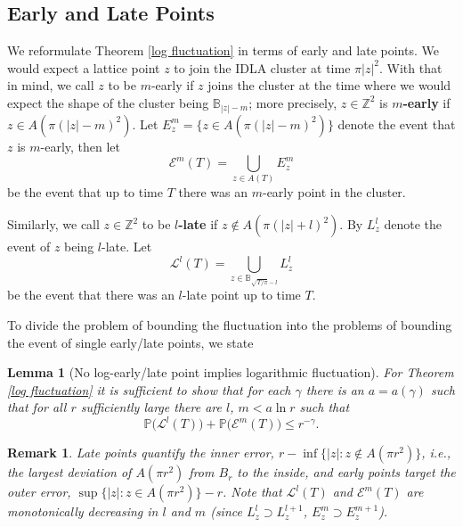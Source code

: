 \documentclass[11pt]{article}
\numberwithin{equation}{section}
\newtheorem{lemma}[theorem]{Lemma}
\newtheorem*{remark}{Remark}
\begin{document}
\subsection{Early and Late Points}

We reformulate Theorem \ref{log fluctuation} 
in terms of early and late points. 
We would expect a lattice point 
$z$ to join the IDLA cluster at time 
$\pi |z|^2$. With that in mind, we call $z$ to be
$m$-early if $z$ joins the cluster at the time 
where we would expect the shape of the cluster 
being $\mathbb{B}_{|z|-m}$; more precisely, 
$z \in \mathbb{Z}^2$ is \hbox{\textbf{$m$-early}} if 
$z \in A(\pi(|z|-m)^2)$. 
Let 
$E^m_z = \{z \in A(\pi(|z|-m)^2)\} 
\label{D: z is m early}$ denote the event
that $z$ is $m$-early, then let
\begin{equation}\label{D: def E_m(T)}
  \nonumber
  \mathcal{E}^m(T) = 
    \bigcup_{z \in A(T)} E^m_z
\end{equation}
be the event that up to time $T$ 
there was an $m$-early point in the cluster. 

Similarly, we call $z \in \mathbb{Z}^2$ to be 
\textbf{$l$-late} if 
\hbox{$z \notin A(\pi (|z| + l)^2)$.} 
By $L^l_z \label{D: z is l late}$
denote the event of $z$ being $l$-late. Let 
\begin{equation}\label{D: L_l(T)}
  \mathcal{L}^l(T) = 
    \bigcup_{z \in \mathbb{B}_{\sqrt{T/\pi} -l}} 
      L^l_z
\end{equation}
be the event that there was an $l$-late point up to time $T$. 

To divide the problem of bounding the fluctuation into the 
problems of bounding the event of single early/late 
points, we state  

\begin{lemma}[No log-early/late point implies logarithmic fluctuation]
  \label{L: logarithmic fluctuation in terms of late and early points}
  For Theorem \ref{log fluctuation} 
  it is sufficient to show that 
  for each $\gamma$ there is an $a= a(\gamma)$ 
  such that for all $r$ sufficiently large there are 
  $l$, $m < a \ln r$ such that
  \begin{equation}\nonumber
    \mathbb{P} \big( \mathcal{L}^l(T)\big) 
    +\mathbb{P} \big( \mathcal{E}^m(T)\big)
    \leq r^{-\gamma}.
  \end{equation}
\end{lemma}

\begin{remark}
  Late points quantify the inner error,
  $r - \inf \{|z| : z \notin A(\pi r^2) \}$,
  i.e., the largest deviation of $A(\pi r^2)$ 
  from  $B_r$ to the inside, and early points target the outer error,
  $\sup \{|z| : z \in A(\pi r^2) \} - r$. 
  Note that $\mathcal{L}^l(T)$ and $\mathcal{E}^m(T)$ 
  are monotonically decreasing in $l$ and $m$ 
  (since $L^l_z \supset L^{l+1}_z$, $E^m_z \supset E^{m+1}_z$). 
\end{remark}
\end{document}
